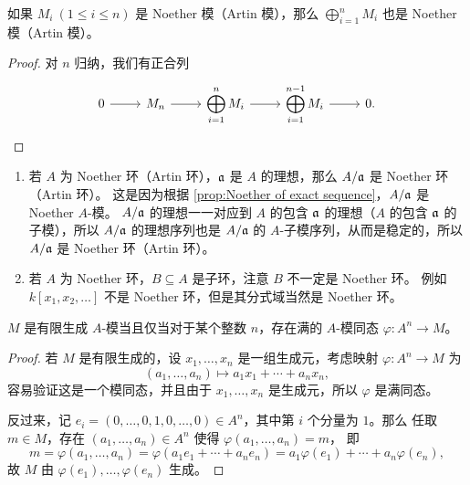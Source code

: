 \begin{corollary}\label{coro:direct sum of Noether}
  如果 $M_i\ (1\leq i\leq n)$ 是 Noether 模（Artin 模），那么 $\bigoplus_{i=1}^n M_i$
  也是 Noether 模（Artin 模）。
\end{corollary}
\begin{proof}
  对 $n$ 归纳，我们有正合列
  \[
    \begin{tikzcd}
      0\arrow[r] & M_n\arrow[r] & \displaystyle\bigoplus_{i=1}^n M_i\arrow[r] & \displaystyle\bigoplus_{i=1}^{n-1} M_i\arrow[r]
      & 0.
    \end{tikzcd}
    \qedhere
  \]
\end{proof}

\begin{example}
  \mbox{}
  \begin{enumerate}
    \item 若 $A$ 为 Noether 环（Artin 环），$\mathfrak{a}$ 是 $A$ 的理想，那么 $A/\mathfrak{a}$ 是 Noether 
    环（Artin 环）。
    这是因为根据 \autoref{prop:Noether of exact sequence}，$A/\mathfrak{a}$ 是 Noether $A$-模。
    $A/\mathfrak{a}$ 的理想一一对应到 $A$ 的包含 $\mathfrak{a}$ 的理想（$A$ 的包含 $\mathfrak{a}$ 的子模），所以
    $A/\mathfrak{a}$ 的理想序列也是 $A/\mathfrak{a}$ 的 $A$-子模序列，从而是稳定的，所以 $A/\mathfrak{a}$ 
    是 Noether 环（Artin 环）。
    \item 若 $A$ 为 Noether 环，$B\subseteq A$ 是子环，注意 $B$ 不一定是 Noether 环。
    例如 $k[x_1,x_2,\dots]$ 不是 Noether 环，但是其分式域当然是 Noether 环。
  \end{enumerate}
\end{example}

\begin{lemma}\label{lemma:finite generated module}
  $M$ 是有限生成 $A$-模当且仅当对于某个整数 $n$，存在满的 $A$-模同态 
  $\varphi:A^n\to M$。
\end{lemma}
\begin{proof}
  若 $M$ 是有限生成的，设 $x_1,\dots,x_n$ 是一组生成元，考虑映射 $\varphi:A^n\to M$ 为
  \[
    (a_1,\dots,a_n)\mapsto a_1x_1+\cdots+a_nx_n,
  \]
  容易验证这是一个模同态，并且由于 $x_1,\dots,x_n$ 是生成元，所以 $\varphi$ 是满同态。

  反过来，记 $e_i=(0,\dots,0,1,0,\dots,0)\in A^n$，其中第 $i$ 个分量为 $1$。那么
  任取 $m\in M$，存在 $(a_1,\dots,a_n)\in A^n$ 使得 $\varphi(a_1,\dots,a_n)=m$，
  即
  \[
    m=\varphi(a_1,\dots,a_n)=\varphi(a_1e_1+\cdots+a_ne_n)
    =a_1\varphi(e_1)+\cdots+a_n\varphi(e_n),  
  \]
  故 $M$ 由 $\varphi(e_1),\dots,\varphi(e_n)$ 生成。
\end{proof}

